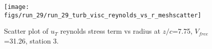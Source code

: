 \begin{figure}[H]
\centering
\texttt{[image: figs/run\_29/run\_29\_turb\_visc\_reynolds\_vs\_r\_meshscatter]}
\caption{Scatter plot of $
u_T$ reynolds stress term vs radius at $z/c$=7.75, $V_{free}$=31.26, station 3.}
\label{fig:run_29_turb_visc_reynolds_vs_r_meshscatter}
\end{figure}


